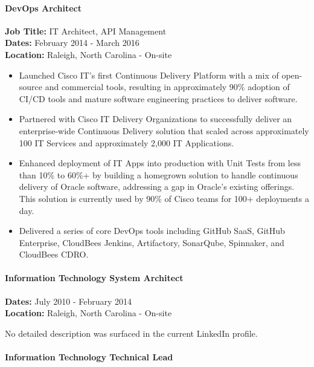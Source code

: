 \documentclass[
]{article}
\providecommand{\tightlist}{%
  \setlength{\itemsep}{0pt}\setlength{\parskip}{0pt}}
\renewcommand{\tightlist}{%
  \setlength{\itemsep}{0.12em}\setlength{\parskip}{0pt}\setlength{\parsep}{0pt}%
}
\begin{document}
\paragraph{DevOps Architect}\label{devops-architect-2}

\textbf{Job Title:} IT Architect, API Management\\
\textbf{Dates:} February 2014 - March 2016\\
\textbf{Location:} Raleigh, North Carolina - On-site

\begin{itemize}
\tightlist
\item
  Launched Cisco IT's first Continuous Delivery Platform with a mix of
  open-source and commercial tools, resulting in approximately 90\%
  adoption of CI/CD tools and mature software engineering practices to
  deliver software.
\item
  Partnered with Cisco IT Delivery Organizations to successfully deliver
  an enterprise-wide Continuous Delivery solution that scaled across
  approximately 100 IT Services and approximately 2,000 IT Applications.
\item
  Enhanced deployment of IT Apps into production with Unit Tests from
  less than 10\% to 60\%+ by building a homegrown solution to handle
  continuous delivery of Oracle software, addressing a gap in Oracle's
  existing offerings. This solution is currently used by 90\% of Cisco
  teams for 100+ deployments a day.
\item
  Delivered a series of core DevOps tools including GitHub SaaS, GitHub
  Enterprise, CloudBees Jenkins, Artifactory, SonarQube, Spinnaker, and
  CloudBees CDRO.
\end{itemize}

\paragraph{Information Technology System
Architect}\label{information-technology-system-architect}

\textbf{Dates:} July 2010 - February 2014\\
\textbf{Location:} Raleigh, North Carolina - On-site

No detailed description was surfaced in the current LinkedIn profile.

\paragraph{Information Technology Technical
Lead}\label{information-technology-technical-lead}
\end{document}
